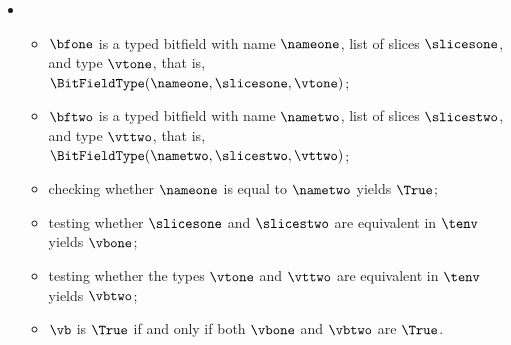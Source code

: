 \begin{itemize}
  \item {}
  \begin{itemize}
    \item $\bfone$ is a typed bitfield with name $\nameone$, list of slices $\slicesone$, and type $\vtone$, that is,
          $\BitFieldType(\nameone, \slicesone, \vtone)$;
    \item $\bftwo$ is a typed bitfield with name $\nametwo$, list of slices $\slicestwo$, and type $\vttwo$, that is,
          $\BitFieldType(\nametwo, \slicestwo, \vttwo)$;
    \item checking whether $\nameone$ is equal to $\nametwo$ yields $\True$\ProseTerminateAs{\False};
    \item testing whether $\slicesone$ and $\slicestwo$ are equivalent in $\tenv$ yields $\vbone$\ProseOrTypeError;
    \item testing whether the types $\vtone$ and $\vttwo$ are equivalent in $\tenv$ yields $\vbtwo$\ProseOrTypeError;
    \item $\vb$ is $\True$ if and only if both $\vbone$ and $\vbtwo$ are $\True$.
  \end{itemize}
\end{itemize}

